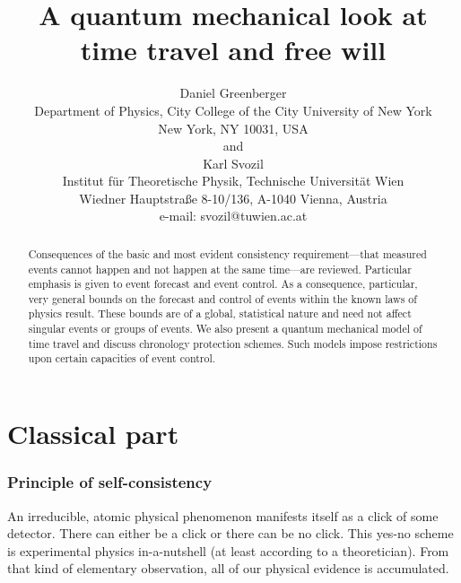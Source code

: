 \renewcommand{\baselinestretch}{1.2}
\sloppy


\def\frak{\cal }
\def\Bbb{\bf }

\title{A quantum mechanical look at time travel and free will}
\author{Daniel Greenberger \\
 {\small Department of Physics,}
  {\small City College of the City University of New York}     \\
  {\small New York, NY 10031,}
  {\small USA   }            \\
{\small and}\\
Karl Svozil\\
 {\small Institut f\"ur Theoretische Physik,}
  {\small Technische Universit\"at Wien }     \\
  {\small Wiedner Hauptstra\ss e 8-10/136,}
  {\small A-1040 Vienna, Austria   }            \\
  {\small e-mail: svozil@tuwien.ac.at}}
\date{ }
\maketitle


\begin{abstract}
Consequences  of the basic and most evident consistency
requirement---that measured events cannot happen and not happen at the same
time---are reviewed.
Particular emphasis is given to event forecast and event control.
As a consequence, particular, very general bounds on the forecast and
control of events within the known laws of physics result.
These bounds are of a global, statistical
nature and need not affect singular events or groups of events.
We also present a quantum mechanical model of time travel and
discuss chronology protection schemes.
Such models impose restrictions upon certain capacities
of event control.
\end{abstract}

\section*{Classical part}
\subsubsection*{Principle of self-consistency}
An irreducible, atomic physical phenomenon
manifests itself as a click of some detector.
There can either be a click or there can be no click.
This yes-no scheme is experimental physics in-a-nutshell
(at least according to a theoretician).
From that kind of elementary observation, all of our physical
evidence is accumulated.

